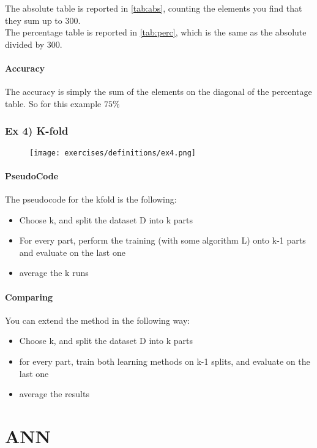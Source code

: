 The absolute table is reported in \ref{tab:abs}, counting the elements you find that they sum up to 300.\\
The percentage table is reported in \ref{tab:perc}, which is the same as the absolute divided by 300.
\paragraph{Accuracy}
The accuracy is simply the sum of the elements on the diagonal of the percentage table. So for this example $75\%$


\subsubsection{Ex 4) K-fold }


\begin{figure}[H]
    \centering
    \texttt{[image: exercises/definitions/ex4.png]}
\end{figure}


\paragraph{PseudoCode}
The pseudocode for the kfold is the following:
\begin{itemize}
\item Choose k, and split the dataset D into k parts
\item For every part, perform the training (with some algorithm L) onto k-1 parts and evaluate on the last one 
\item average the k runs 
\end{itemize}

\paragraph{Comparing}
You can extend the method in the following way:
\begin{itemize}
\item Choose k, and split the dataset D into k parts
\item for every part, train both learning methods on k-1 splits, and evaluate on the last one
\item average the results
\end{itemize}

\section{ANN}

